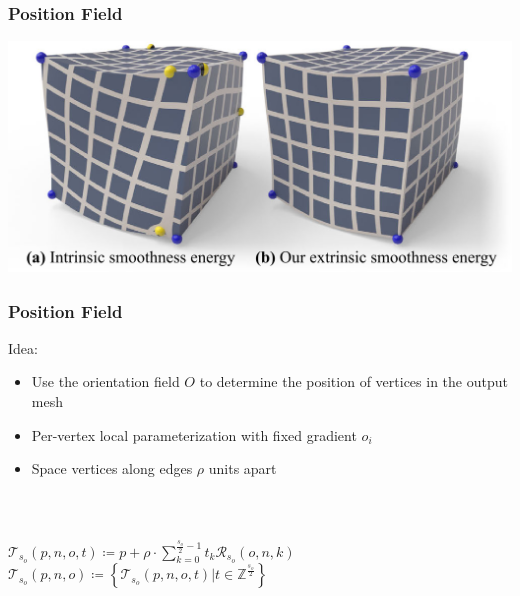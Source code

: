 \documentclass[aspectratio=43,sanserif,professionalfonts]{beamer}
\begin{document}
\begin{frame}
	\frametitle{Position Field}
	\centering
	\includegraphics[width=\textwidth]{img/position-field-illustration.png}
\end{frame}

\begin{frame}
	\frametitle{Position Field}
	Idea:
	\begin{itemize}
		\item	Use the orientation field $O$ to determine the position of vertices in the output mesh
		\item	Per-vertex local parameterization with fixed gradient $o_i$
		\item	Space vertices along edges $\rho$ units apart
	\end{itemize}
	\pause
	~\\
	\begin{columns}
		\begin{column}{0.7\textwidth}
			\begin{tcolorbox}[colback=green!5,colframe=green!40!black,title=Symmetry Group - Integer Translations]
				$\mathcal{T}_{s_o}(p,n,o,t) \coloneqq p + \rho \cdot \sum\limits_{k=0}^{\frac{s_o}{2}-1} t_k \mathcal{R}_{s_o}(o,n,k)$ \\
				$\mathcal{T}_{s_o}(p,n,o) \coloneqq \left\{\mathcal{T}_{s_o}(p,n,o,t) \vert t \in \mathbb{Z}^{\frac{s_o}{2}}\right\}$
			\end{tcolorbox}
		\end{column}
		\begin{column}{0.2\textwidth}
			\centering

\end{column}
\end{columns}
\end{frame}
\end{document}

